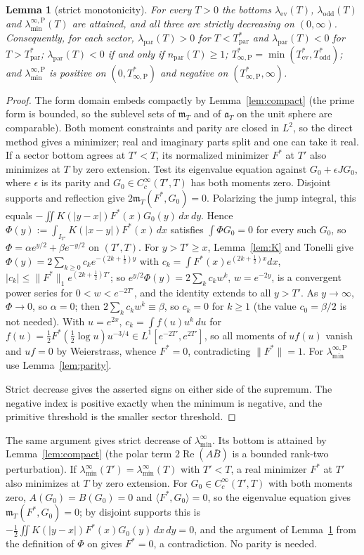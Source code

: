 \documentclass[10pt]{amsart}
\newtheorem{lemma}[theorem]{Lemma}
\theoremstyle{definition}
\theoremstyle{remark}
\newcommand{\Rel}{\operatorname{Re}}
\newcommand{\mT}{\mathfrak m_T}
\newcommand{\laminf}{\lambda^{\infty}_{\min}}
\newcommand{\laminfP}{\lambda^{\infty,\mathrm P}_{\min}}
\begin{document}
\begin{lemma}[strict monotonicity]\label{lem:strict}
For every $T>0$ the bottoms $\lambda_{\mathrm{ev}}(T)$, $\lambda_{\mathrm{odd}}(T)$ and
$\laminfP(T)$ are attained, and all three are strictly decreasing on $(0,\infty)$. Consequently, for each
sector, $\lambda_{\mathrm{par}}(T)>0$ for $T<T^*_{\mathrm{par}}$ and $\lambda_{\mathrm{par}}(T)<0$ for
$T>T^*_{\mathrm{par}}$; $\lambda_{\mathrm{par}}(T)<0$ if and only if $n_{\mathrm{par}}(T)\ge1$;
$T^*_{\infty,\mathrm P}=\min(T^*_{\mathrm{ev}},T^*_{\mathrm{odd}})$; and $\laminfP$ is positive on
$(0,T^*_{\infty,\mathrm P})$ and negative on $(T^*_{\infty,\mathrm P},\infty)$.
\end{lemma}
\begin{proof}
The form domain embeds compactly by Lemma~\ref{lem:compact} (the prime form is bounded, so the
sublevel sets of $\mT$ and of $\mathfrak a_T$ on the unit sphere are comparable). Both
moment constraints and parity are closed in $L^2$, so the direct method
gives a minimizer; real and imaginary parts split and one can take it real.
If a sector bottom agrees at $T'<T$, its normalized minimizer $F^*$ at
$T'$ also minimizes at $T$ by zero extension. Test its eigenvalue equation
against $G_0+\epsilon JG_0$, where $\epsilon$ is its parity and
$G_0\in C_c^\infty(T',T)$ has both moments zero. Disjoint supports and
reflection give $2\mT(F^*,G_0)=0$. Polarizing the jump integral, this
equals $-\iint K(|y-x|)F^*(x)G_0(y)\,dx\,dy$. Hence
$\Phi(y):=\int_{I_{T'}}K(|x-y|)F^*(x)\,dx$ satisfies $\int\Phi G_0=0$ for every such $G_0$, so
$\Phi=\alpha e^{y/2}+\beta e^{-y/2}$ on $(T',T)$. For $y>T'\ge x$, Lemma~\ref{lem:K} and Tonelli give
$\Phi(y)=2\sum_{k\ge0}c_ke^{-(2k+\frac12)y}$ with $c_k=\int F^*(x)e^{(2k+\frac12)x}dx$,
$|c_k|\le\|F^*\|_1e^{(2k+\frac12)T'}$; so $e^{y/2}\Phi(y)=2\sum_kc_kw^k$, $w=e^{-2y}$, is a convergent
power series for $0<w<e^{-2T'}$, and the identity extends to all $y>T'$. As $y\to\infty$, $\Phi\to0$,
so $\alpha=0$; then $2\sum_kc_kw^k\equiv\beta$, so $c_k=0$ for $k\ge1$ (the value $c_0=\beta/2$ is not
needed). With $u=e^{2x}$, $c_k=\int f(u)u^k\,du$ for
$f(u)=\frac12F^*(\frac12\log u)u^{-3/4}\in L^1[e^{-2T'},e^{2T'}]$, so all moments of $uf(u)$ vanish and
$uf=0$ by Weierstrass, whence $F^*=0$, contradicting $\|F^*\|=1$. For $\laminfP$ use Lemma~\ref{lem:parity}.

Strict decrease gives the asserted signs on either side of the supremum.
The negative index is positive exactly when the minimum is negative,
and the primitive threshold is the smaller sector threshold.
\end{proof}
The same argument gives strict decrease of $\laminf$. Its bottom is attained by Lemma~\ref{lem:compact}
(the polar term $2\Rel(A\bar B)$ is a bounded rank-two perturbation). If $\laminf(T')=\laminf(T)$ with
$T'<T$, a real minimizer $F^*$ at $T'$ also minimizes at $T$ by zero extension. For $G_0\in C_c^\infty(T',T)$
with both moments zero, $A(G_0)=B(G_0)=0$ and $\langle F^*,G_0\rangle=0$, so the eigenvalue equation gives
$\mT(F^*,G_0)=0$; by disjoint supports this is $-\frac12\iint K(|y-x|)F^*(x)G_0(y)\,dx\,dy=0$, and the
argument of Lemma~\ref{lem:strict} from the definition of $\Phi$ on gives $F^*=0$, a contradiction. No parity
is needed.
\end{document}
